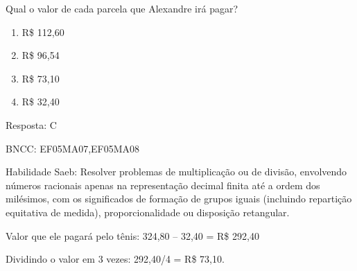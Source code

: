 Qual o valor de cada parcela que Alexandre irá pagar?

\begin{enumerate}
\def\labelenumi{\alph{enumi})}
\item
  R\$ 112,60
\item
  R\$ 96,54
\item
  R\$ 73,10
\item
  R\$ 32,40
\end{enumerate}

Resposta: C

BNCC: EF05MA07,EF05MA08

Habilidade Saeb: Resolver problemas de multiplicação ou de divisão,
envolvendo números racionais apenas na representação decimal finita até
a ordem dos milésimos, com os significados de formação de grupos iguais
(incluindo repartição equitativa de medida), proporcionalidade ou
disposição retangular.

Valor que ele pagará pelo tênis: 324,80 -- 32,40 = R\$ 292,40

Dividindo o valor em 3 vezes: 292,40/4 = R\$ 73,10.
